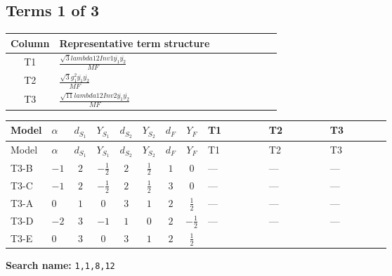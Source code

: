 \documentclass[8pt]{article}
\begin{document}
\begin{landscape}
\subsection*{Terms 1 of 3}
\begin{center}
\begin{tabular}{@{}c >{\raggedright\arraybackslash}p{0.82\linewidth}@{}}
\toprule
Column & Representative term structure \\
\midrule
T1 & \(\displaystyle \frac{\sqrt{3} lambda12Inv1 \overline{y_{1}} \overline{y_{2}}}{MF}\) \\
\midrule
T2 & \(\displaystyle \frac{\sqrt{3} g_{1}^{2} \overline{y_{1}} \overline{y_{2}}}{MF}\) \\
\midrule
T3 & \(\displaystyle \frac{\sqrt{11} lambda12Inv2 \overline{y_{1}} \overline{y_{2}}}{MF}\) \\
\midrule
\bottomrule
\end{tabular}
\end{center}
\smallskip
\tiny
\begin{longtable}{@{}llcccccc >{\raggedright\arraybackslash}p{0.21\linewidth} >{\raggedright\arraybackslash}p{0.21\linewidth} >{\raggedright\arraybackslash}p{0.21\linewidth}@{}}
\toprule
Model & $\alpha$ & $d_{S_1}$ & $Y_{S_1}$ & $d_{S_2}$ & $Y_{S_2}$ & $d_F$ & $Y_F$ & T1 & T2 & T3 \\
\midrule
\endfirsthead
\toprule
Model & $\alpha$ & $d_{S_1}$ & $Y_{S_1}$ & $d_{S_2}$ & $Y_{S_2}$ & $d_F$ & $Y_F$ & T1 & T2 & T3 \\
\midrule
\endhead
T3-B & $-1$ & $2$ & $-\frac{1}{2}$ & $2$ & $\frac{1}{2}$ & $1$ & $0$ & --- & --- & --- \\
\midrule
T3-C & $-1$ & $2$ & $-\frac{1}{2}$ & $2$ & $\frac{1}{2}$ & $3$ & $0$ & --- & --- & --- \\
\midrule
T3-A & $0$ & $1$ & $0$ & $3$ & $1$ & $2$ & $\frac{1}{2}$ & --- & --- & --- \\
\midrule
T3-D & $-2$ & $3$ & $-1$ & $1$ & $0$ & $2$ & $-\frac{1}{2}$ & --- & --- & --- \\
\midrule
T3-E & $0$ & $3$ & $0$ & $3$ & $1$ & $2$ & $\frac{1}{2}$ & \scriptsize\adjustbox{max width=\linewidth}{$\begin{gathered} - \frac{\sqrt{3} lambda12Inv1 \overline{y_{1}} \overline{y_{2}}}{6 MF}\end{gathered}$} & \scriptsize\adjustbox{max width=\linewidth}{$\begin{gathered} \frac{\sqrt{3} g_{1}^{2} \overline{y_{1}} \overline{y_{2}}}{8 MF}\end{gathered}$} & \scriptsize\adjustbox{max width=\linewidth}{$\begin{gathered} \frac{3 \sqrt{11} lambda12Inv2 \overline{y_{1}} \overline{y_{2}}}{22 MF}\end{gathered}$} \\
\midrule
\bottomrule
\end{longtable}
\clearpage
\noindent\textbf{Search name: }\texttt{1,1,8,12}\par\smallskip

\end{landscape}
\end{document}
